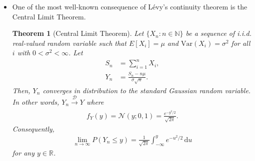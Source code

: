 \documentclass[10pt]{article}
\newtheorem{theorem}[lemma]{Theorem}
\numberwithin{lemma}{section}
\newcommand{\dee}{\mathrm{d}}
\newcommand{\Var}{\mathrm{Var}}
\newcommand{\ve}[1]{\mathbf{#1}}
\newcommand{\ves}[1]{\boldsymbol{#1}}
\newcommand{\mcal}[1]{\mathcal{#1}}
\newcommand{\Real}{\mathbb{R}}
\newcommand{\Nat}{\mathbb{N}}
\begin{document}
\begin{itemize}
\begin{theorem}[L\'{e}vy's continuity theorem \#2]
\begin{enumerate}
      \item Suppose $\varphi_{X_n}$ converges to a function $f(\ves{\xi})$ for all $\ves{\xi} \in \Real^d$, and suppose that $f$ is continuous at $\ve{0}$. Then, there exists a probability measure $Q$ on $\mcal{B}(\Real^d)$ such that $f(\ves{\xi}) = \hat{Q}(\ves{\ves{\xi}})$ for all $\ves{\xi} \in \Real^d$. Morever, $\{ P_{X_n} \}_{n \in \Nat}$ converges weakly to $Q$.
    \end{enumerate}
  \end{theorem}

  \item One of the most well-known consequence of L\'{e}vy's continuity theorem is the Central Limit Theorem.

  \begin{theorem}[Central Limit Theorem]
    Let $\{ X_n : n \in \Nat \}$ be a sequence of i.i.d\@. real-valued random variable such that $E[X_i] = \mu$ and $\Var(X_i) = \sigma^2$ for all $i$ with $0 < \sigma^2 < \infty$. Let 
    \begin{align*}
      S_n &= \sum_{i=1}^n X_i, \\
      Y_n &= \frac{S_n - n\mu}{\sigma \sqrt{n}}.
    \end{align*}
    Then, $Y_n$ converges in distribution to the standard Gaussian random variable. In other words, $Y_n \xrightarrow[]{\mcal{D}} Y$ where
    \begin{align*}
      f_Y(y) = \mcal{N}(y; 0, 1) = \frac{e^{-y^2/2}}{\sqrt{2\pi}}.
    \end{align*}
    Consequently,
    \begin{align*}
      \lim_{n \rightarrow \infty} P(Y_n \leq y) = \frac{1}{\sqrt{2\pi}} \int_{-\infty}^y e^{-u^2/2}\, \dee u
    \end{align*}
    for any $y \in \Real$.
  \end{theorem}
\end{itemize}


 
\end{document}
